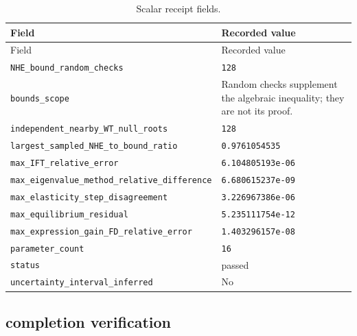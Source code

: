\begingroup\scriptsize
\setlength{\tabcolsep}{3pt}
\begin{longtable}{p{.46\linewidth}p{.46\linewidth}}
\caption{Scalar receipt fields.}\\
\toprule
Field & Recorded value \\
\midrule\endfirsthead
\toprule
Field & Recorded value \\
\midrule\endhead
\bottomrule\endfoot
\nolinkurl{NHE_bound_random_checks} & \texttt{128} \\
\nolinkurl{bounds_scope} & Random checks supplement the algebraic inequality; they are not its proof. \\
\nolinkurl{independent_nearby_WT_null_roots} & \texttt{128} \\
\nolinkurl{largest_sampled_NHE_to_bound_ratio} & \texttt{0.9761054535} \\
\nolinkurl{max_IFT_relative_error} & \texttt{6.104805193e-06} \\
\nolinkurl{max_eigenvalue_method_relative_difference} & \texttt{6.680615237e-09} \\
\nolinkurl{max_elasticity_step_disagreement} & \texttt{3.226967386e-06} \\
\nolinkurl{max_equilibrium_residual} & \texttt{5.235111754e-12} \\
\nolinkurl{max_expression_gain_FD_relative_error} & \texttt{1.403296157e-08} \\
\nolinkurl{parameter_count} & \texttt{16} \\
\nolinkurl{status} & passed \\
\nolinkurl{uncertainty_interval_inferred} & No \\
\end{longtable}
\endgroup



\subsection*{completion verification}

